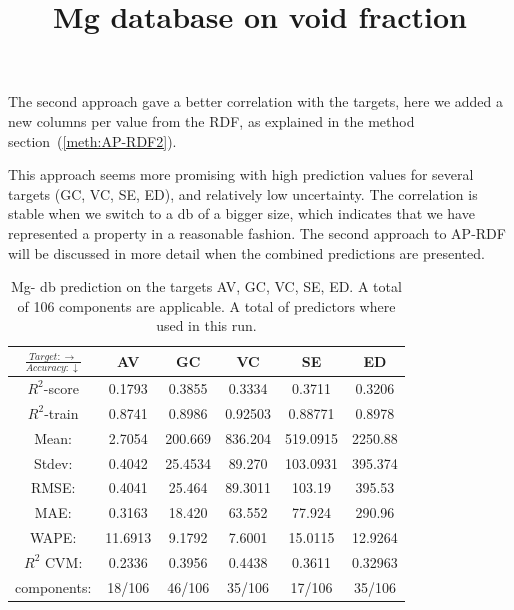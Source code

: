 The second approach gave a better correlation with the targets, here we added a new columns per value from the RDF, as explained in the method section (\ref{meth:AP-RDF2}). 

This approach seems more promising with high prediction values for several targets (GC, VC, SE, ED), and relatively low uncertainty. The correlation is stable when we switch to a db of a bigger size, which indicates that we have represented a property in a reasonable fashion. The second approach to AP-RDF will be discussed in more detail when the combined predictions are presented.  


\begin{table}[H]
\scriptsize
\centering
\caption{Mg- db prediction on the targets AV, GC, VC, SE, ED.  A total of 106 components are applicable. A total of  predictors where used in this run.}
\title{Mg database on void fraction}
\begin{tabular}{|c|c|c|c|c|c|}
	\hline 
	$\frac{Target: \rightarrow}{Accuracy:\downarrow} $ & AV & GC & VC & SE & ED 
	 \\ 
	\hline
	$R^2$-score & 0.1793 & 0.3855 & 0.3334 &  0.3711 &  0.3206\\ 
	\hline 
	$R^2$-train & 0.8741 &  0.8986 & 0.92503&  0.88771 & 0.8978 \\ 
	\hline
	Mean: 	&2.7054	&200.669&836.204	&519.0915&2250.88	\\
	\hline 
	Stdev: 	&0.4042	&25.4534	&89.270	&103.0931&395.374	\\
	\hline 
	RMSE: &0.4041& 25.464 &  89.3011 & 103.19 & 395.53 \\ 
	\hline
	MAE: & 0.3163 & 18.420& 63.552 &  77.924 & 290.96 \\ 
	\hline
	WAPE: &  11.6913 & 9.1792 & 7.6001  & 15.0115 & 12.9264 \\
	\hline
	$R^2$ CVM: & 0.2336 & 0.3956 &  0.4438  & 0.3611 & 0.32963 \\
	\hline
	components: & 18/106 & 46/106 & 35/106  & 17/106 & 35/106 \\
	\hline
\end{tabular}
\label{tab:Mg-APRDF2}
\end{table}


